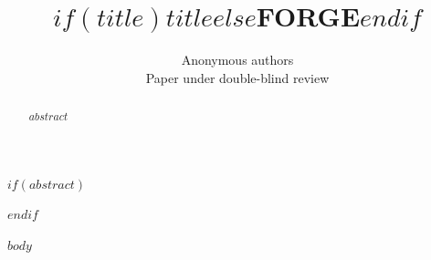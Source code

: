 \documentclass{article}
\title{$if(title)$$title$$else$FORGE$endif$}
\author{Anonymous authors \\ Paper under double-blind review}
\begin{document}
\maketitle

$if(abstract)$
\begin{abstract}
$abstract$
\end{abstract}
$endif$

$body$
\end{document}
